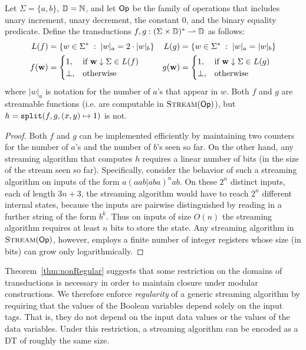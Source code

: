 \begin{theorem}
\label{thm:nonRegular}
Let $\Sigma = \{a,b\}$, $\mathbb{D} = \mathbb{N}$, and let $\textsf{Op}$ be the family of operations that includes unary increment, unary decrement, the constant $0$, and the binary equality predicate. Define the transductions $f, g: (\Sigma \times \mathbb{D})^{*} \rightharpoonup \mathbb{D}$ as follows:
\begin{align*}
L(f) &= \{ w \in \Sigma^{*} \;:\; |w|_a = 2 \cdot |w|_b \}
&
L(g) &= \{ w \in \Sigma^{*} \;:\; |w|_a = |w|_b \}
\\
f(\textbf{w}) &= \begin{cases}
  1, &\text{if $\textbf{w} \downarrow \Sigma \in L(f)$} \\
  \bot, &\text{otherwise}
\end{cases}
&
g(\textbf{w}) &= \begin{cases}
  1, &\text{if $\textbf{w} \downarrow \Sigma \in L(g)$} \\
  \bot, &\text{otherwise}
\end{cases}
\end{align*}
where $|w|_a$ is notation for the number of $a$'s that appear in $w$. Both $f$ and $g$ are streamable functions (i.e. are computable in $\textsc{Stream}(\textsf{Op})$), but $h = \texttt{split}(f, g, (x,y) \mapsto 1)$ is not.
\end{theorem}
\begin{proof}[Proof]
Both $f$ and $g$ can be implemented efficiently by maintaining two counters for the number of $a$'s and the number of $b$'s seen so far.
On the other hand, any streaming algorithm that computes $h$ requires a linear number of bits (in the size of the stream seen so far). Specifically, consider the behavior of such a streaming algorithm on inputs of the form $a(aab | aba)^n ab$. On these $2^n$ distinct inputs, each of length $3n+3$, the streaming algorithm would have to reach $2^n$ different internal states, because the inputs are pairwise distinguished by reading in a further string of the form $b^k$. Thus on inputs of size $O(n)$ the streaming algorithm requires at least $n$ bits to store the state.
Any streaming algorithm in $\textsc{Stream}(\textsf{Op})$, however, employs a finite number of integer registers whose size (in bits) can grow only logarithmically.
\end{proof}

Theorem~\ref{thm:nonRegular} suggests that some restriction on the domains of transductions is necessary in order to maintain closure under modular constructions. We therefore enforce \emph{regularity} of a generic streaming algorithm by requiring that the values of the Boolean variables depend solely on the input tags. That is, they do not depend on the input data values or the values of the data variables. Under this restriction, a streaming algorithm can be encoded as a DT of roughly the same size.

